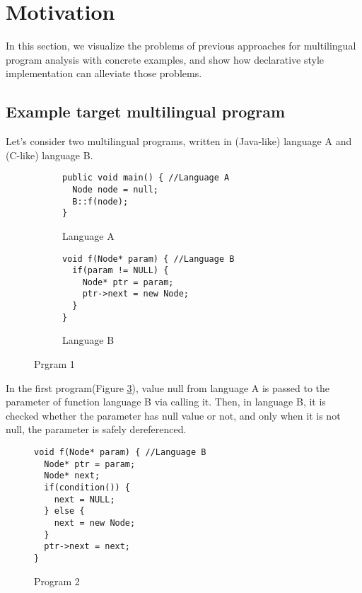 \section{Motivation}

In this section, we visualize the problems of previous approaches for
multilingual program analysis with concrete examples, and show how declarative
style implementation can alleviate those problems.

\subsection{Example target multilingual program}

Let's consider two multilingual programs, written in (Java-like) language A
and (C-like) language B.
\begin{figure}[t]
  \centering
  \vspace{2mm}
  \begin{subfigure}[t]{0.5\textwidth}
    \begin{lstlisting}[style=java,xleftmargin=2.5em]
public void main() { //Language A
  Node node = null;
  B::f(node);
}
    \end{lstlisting}
    \vspace*{-.5em}
    \caption{Language A}
    \label{fig:exam1:langA}
  \end{subfigure}
  \begin{subfigure}[t]{0.5\textwidth}
    \begin{lstlisting}[style=cpp,firstnumber=5,xleftmargin=2.5em]
void f(Node* param) { //Language B
  if(param != NULL) {
    Node* ptr = param;
    ptr->next = new Node;
  }
}
    \end{lstlisting}
    \vspace*{-.5em}
    \caption{Language B}
    \label{fig:exam1:langB}
  \end{subfigure}
  \vspace*{-.5em}
  \caption{Prgram 1}
  \label{fig:exam1}
\end{figure}

In the first program(Figure \ref{fig:exam1}), value null from language A is
passed to the parameter of function language B via calling it. Then, in
language B, it is checked whether the parameter has null value or not, and only
when it is not null, the parameter is safely dereferenced.

\begin{figure}[t]
  \centering
  \vspace{2mm}
  \begin{lstlisting}[style=cpp,firstnumber=5,xleftmargin=2.5em]
void f(Node* param) { //Language B
  Node* ptr = param;
  Node* next;
  if(condition()) {
    next = NULL;
  } else {
    next = new Node;
  }
  ptr->next = next;
}
  \end{lstlisting}
  \vspace*{-.5em}
  \caption{Program 2}
  \label{fig:exam2}
\end{figure}

